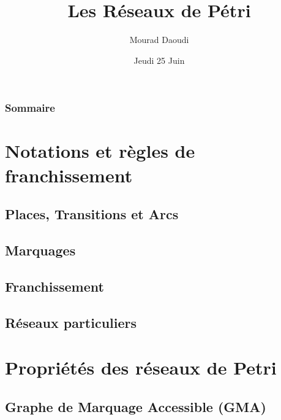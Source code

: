 \documentclass[11pt]{beamer}
\author{Mourad Daoudi}
\title{Les Réseaux de Pétri}
\institute{USTHB}
\date{Jeudi 25 Juin}
\begin{document}
	\maketitle
	\begin{frame}
		\frametitle{Sommaire}
		\tableofcontents{}
	\end{frame}

	
	\section{Notations et règles de franchissement}
		\begin{frame}
	\frametitle{}
	\end{frame}
	\subsection{ Places, Transitions et Arcs       }
		\begin{frame}
	\frametitle{}
	\end{frame}
	\subsection{ Marquages                }
		\begin{frame}
	\frametitle{}
	\end{frame}
	\subsection{ Franchissement             }
		\begin{frame}
	\frametitle{}
	\end{frame}
	\subsection{ Réseaux particuliers          }
		\begin{frame}
	\frametitle{}
	\end{frame}
	\section{Propriétés des réseaux de Petri}
		\begin{frame}
	\frametitle{}
	\end{frame}
	\subsection{ Graphe de Marquage Accessible (GMA)            }
		\begin{frame}
	\frametitle{}
	\end{frame}
\end{document}
